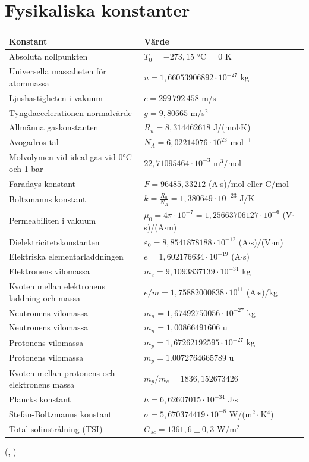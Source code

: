 \chapter{Fysikaliska konstanter}
\begin{table}[h]
\raggedright
\small
\begin{tabularx}{\textwidth}{p{6.5cm}X}
\toprule
\textbf{Konstant} & \textbf{Värde} \\
\midrule
Absoluta nollpunkten & $T_0 = -273,15$ °C = 0 K \\ %
Universella massaheten för atommassa & $u = 1,66053906892 \cdot 10^{-27}$ kg \\ %
Ljushastigheten i vakuum & $c = 299\,792\,458$ m/s \\ %
Tyngdaccelerationen normalvärde & $g = 9,80665$ m/s$^2$ \\ %
Allmänna gaskonstanten & $R_u = 8,314462618$ J/(mol$\cdot$K) \\ %
Avogadros tal & $N_A = 6,02214076 \cdot 10^{23}$ mol$^{-1}$ \\ %
Molvolymen vid ideal gas vid 0°C och 1 bar & $22,71095464 \cdot 10^{-3}$ m$^3$/mol \\ %
Faradays konstant & $F = 96485,33212$ (A$\cdot$s)/mol eller C/mol \\ %
Boltzmanns konstant & $k = \frac{R_u}{N_A} = 1,380649 \cdot 10^{-23}$ J/K \\
Permeabiliten i vakuum & $\mu_0 = 4\pi \cdot 10^{-7} = 1,25663706127 \cdot 10^{-6}$ (V$\cdot$s)/(A$\cdot$m) \\ %
Dielektricitetskonstanten & $\varepsilon_0 = 8,8541878188 \cdot 10^{-12}$ (A$\cdot$s)/(V$\cdot$m) \\ %
Elektriska elementarladdningen & $e = 1,602176634 \cdot 10^{-19}$ (A$\cdot$s) \\ %
Elektronens vilomassa & $m_e = 9,1093837139 \cdot 10^{-31}$ kg \\ %
Kvoten mellan elektronens laddning och massa & $e/m = 1,75882000838 \cdot 10^{11}$ (A$\cdot$s)/kg \\ %
Neutronens vilomassa & $m_n = 1,67492750056 \cdot 10^{-27}$ kg \\ %
Neutronens vilomassa & $m_n = 1,00866491606$ u \\ %
Protonens vilomassa & $m_p = 1,67262192595 \cdot 10^{-27}$ kg \\ %
Protonens vilomassa & $m_p = 1.0072764665789$ u \\ %
Kvoten mellan protonens och elektronens massa & $m_p/m_e = 1836,152673426$ \\ %
Plancks konstant & $h = 6,62607015 \cdot 10^{-34}$ J$\cdot$s \\ %
Stefan-Boltzmanns konstant & $\sigma = 5,670374419 \cdot 10^{-8}$ W/(m$^2\cdot$K$^4$) \\ %
Total solinstrålning (TSI) & $G_{sc} = 1361,6 \pm 0,3 $ W/m$^2$ \\
\bottomrule
\end{tabularx}
\end{table}
(\cite{NIST_Constants_2026}, \cite{NASA_TSI_2026})
